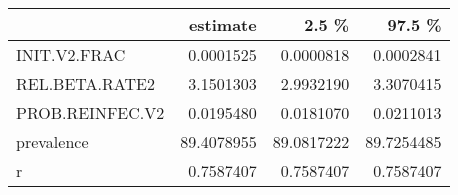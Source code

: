 
\begin{tabular}{l|r|r|r}
\hline
  & estimate & 2.5 \% & 97.5 \%\\
\hline
INIT.V2.FRAC & 0.0001525 & 0.0000818 & 0.0002841\\
\hline
REL.BETA.RATE2 & 3.1501303 & 2.9932190 & 3.3070415\\
\hline
PROB.REINFEC.V2 & 0.0195480 & 0.0181070 & 0.0211013\\
\hline
prevalence & 89.4078955 & 89.0817222 & 89.7254485\\
\hline
r & 0.7587407 & 0.7587407 & 0.7587407\\
\hline
\end{tabular}